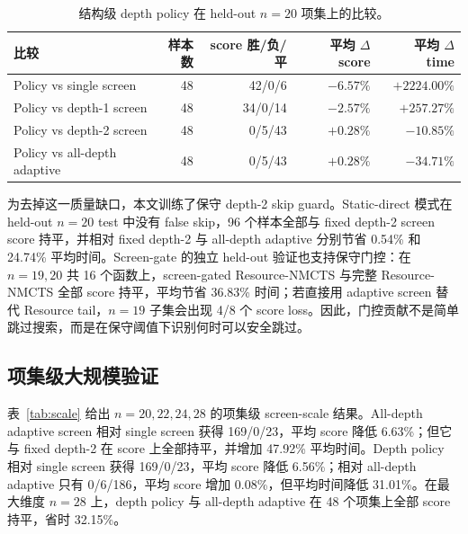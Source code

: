 \documentclass[UTF8,fontset=macnew,11pt]{ctexart}
\newcommand{\method}{Resource-NMCTS}
\begin{document}
\begin{table}[t]
\centering
\small
\caption{结构级 depth policy 在 held-out $n=20$ 项集上的比较。}
\label{tab:policy}
\begin{tabular}{lrrrr}
\toprule
比较 & 样本数 & score 胜/负/平 & 平均 $\Delta$ score & 平均 $\Delta$ time \\
\midrule
Policy vs single screen & 48 & 42/0/6 & $-6.57\%$ & $+2224.00\%$ \\
Policy vs depth-1 screen & 48 & 34/0/14 & $-2.57\%$ & $+257.27\%$ \\
Policy vs depth-2 screen & 48 & 0/5/43 & $+0.28\%$ & $-10.85\%$ \\
Policy vs all-depth adaptive & 48 & 0/5/43 & $+0.28\%$ & $-34.71\%$ \\
\bottomrule
\end{tabular}
\end{table}

为去掉这一质量缺口，本文训练了保守 depth-2 skip guard。Static-direct 模式在 held-out $n=20$ test 中没有 false skip，96 个样本全部与 fixed depth-2 screen score 持平，并相对 fixed depth-2 与 all-depth adaptive 分别节省 0.54\% 和 24.74\% 平均时间。Screen-gate 的独立 held-out 验证也支持保守门控：在 $n=19,20$ 共 16 个函数上，screen-gated \method{} 与完整 \method{} 全部 score 持平，平均节省 36.83\% 时间；若直接用 adaptive screen 替代 Resource tail，$n=19$ 子集会出现 4/8 个 score loss。因此，门控贡献不是简单跳过搜索，而是在保守阈值下识别何时可以安全跳过。

\subsection{项集级大规模验证}

表~\ref{tab:scale} 给出 $n=20,22,24,28$ 的项集级 screen-scale 结果。All-depth adaptive screen 相对 single screen 获得 169/0/23，平均 score 降低 6.63\%；但它与 fixed depth-2 在 score 上全部持平，并增加 47.92\% 平均时间。Depth policy 相对 single screen 获得 169/0/23，平均 score 降低 6.56\%；相对 all-depth adaptive 只有 0/6/186，平均 score 增加 0.08\%，但平均时间降低 31.01\%。在最大维度 $n=28$ 上，depth policy 与 all-depth adaptive 在 48 个项集上全部 score 持平，省时 32.15\%。
\end{document}
